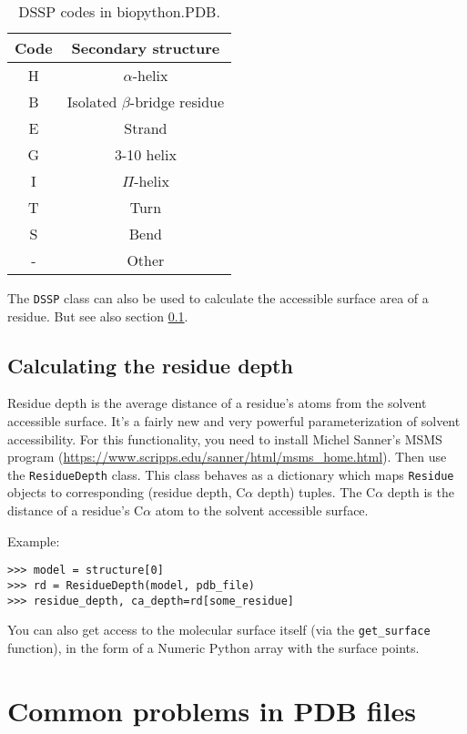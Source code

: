 \begin{table}
\begin{tabular}{|c|c|}
\hline
Code&
Secondary structure \\
\hline
\hline
H&
$\alpha$-helix \\
\hline
B&
Isolated $\beta$-bridge residue \\
\hline
E&
Strand \\
\hline
G&
3-10 helix \\
\hline
I&
$\Pi$-helix \\
\hline
T&
Turn\\
\hline
S&
Bend \\
\hline
-&
Other\\
\hline
\end{tabular}
\caption{DSSP codes in biopython.PDB.}
\label{table:DSSP-codes}
\end{table}

The \texttt{DSSP} class can also be used to calculate the accessible surface area of a residue. But see also section \ref{sec:residue_depth}.

\subsection{Calculating the residue depth}
\label{sec:residue_depth}

Residue depth is the average distance of a residue's atoms from the
solvent accessible surface. It's a fairly new and very powerful parameterization
of solvent accessibility. For this functionality, you need to install
Michel Sanner's MSMS program (\url{https://www.scripps.edu/sanner/html/msms_home.html}).
Then use the \texttt{ResidueDepth} class. This class behaves as a
dictionary which maps \texttt{Residue} objects to corresponding (residue
depth, C$\alpha$ depth) tuples. The C$\alpha$ depth is the distance
of a residue's C$\alpha$ atom to the solvent accessible surface.

Example:

\begin{verbatim}
>>> model = structure[0]
>>> rd = ResidueDepth(model, pdb_file)
>>> residue_depth, ca_depth=rd[some_residue]
\end{verbatim}
You can also get access to the molecular surface itself (via the \texttt{get\_surface}
function), in the form of a Numeric Python array with the surface points.

\section{Common problems in PDB files}

